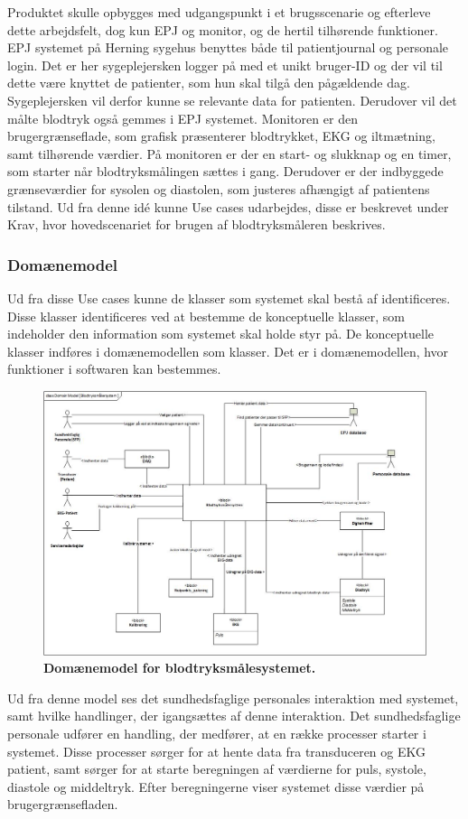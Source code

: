 Produktet skulle opbygges med udgangspunkt i et brugsscenarie og efterleve dette arbejdsfelt, dog kun EPJ og monitor, og de hertil tilhørende funktioner. EPJ systemet på Herning sygehus benyttes både til patientjournal og personale login. Det er her sygeplejersken logger på med et unikt bruger-ID og der vil til dette være knyttet de patienter, som hun skal tilgå den pågældende dag. Sygeplejersken vil derfor kunne se relevante data for patienten. Derudover vil det målte blodtryk også gemmes i EPJ systemet. Monitoren er den brugergrænseflade, som grafisk præsenterer blodtrykket, EKG og iltmætning, samt tilhørende værdier. På monitoren er der en start- og slukknap og en timer, som starter når blodtryksmålingen sættes i gang. Derudover er der indbyggede grænseværdier for sysolen og diastolen, som justeres afhængigt af patientens tilstand. 
Ud fra denne idé kunne Use cases udarbejdes, disse er beskrevet under Krav, hvor hovedscenariet for brugen af blodtryksmåleren beskrives.
\subsubsection{Domænemodel} 
Ud fra disse Use cases kunne de klasser som systemet skal bestå af identificeres. Disse klasser identificeres ved at bestemme de konceptuelle klasser, som indeholder den information som systemet skal holde styr på. De konceptuelle klasser indføres i domænemodellen som klasser. Det er i domænemodellen, hvor funktioner i softwaren kan bestemmes. 
\begin{figure}[H]
\includegraphics[width =1.0\textwidth , center]{billeder/DM}
\caption{\textbf{Domænemodel for blodtryksmålesystemet.}}
\end{figure}
Ud fra denne model ses det sundhedsfaglige personales interaktion med systemet, samt hvilke handlinger, der igangsættes af denne interaktion. Det sundhedsfaglige personale udfører en handling, der medfører, at en række processer starter i systemet. Disse processer sørger for at hente data fra transduceren og EKG patient, samt sørger for at starte beregningen af værdierne for puls,
systole, diastole og middeltryk. Efter beregningerne viser systemet disse værdier på brugergrænsefladen. 

